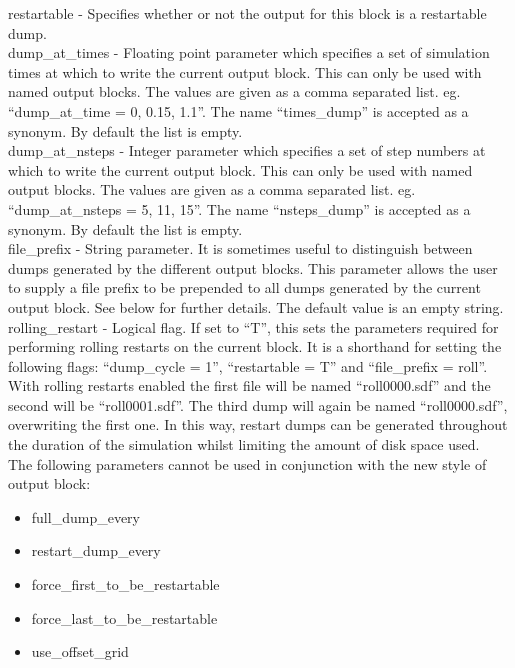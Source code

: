 {\emphtext restartable} - Specifies whether or not the output for this
  block is a restartable dump.\\

{\emphtext dump\_at\_times} - Floating point parameter which specifies a
  set of simulation times at which to write the current output block. This
  can only be used with named output blocks. The values are given as a
  comma separated list. eg. ``dump\_at\_time = 0, 0.15, 1.1''. The name
  ``times\_dump'' is accepted as a synonym. By default
  the list is empty.\\

{\emphtext dump\_at\_nsteps} - Integer parameter which specifies a
  set of step numbers at which to write the current output block. This
  can only be used with named output blocks. The values are given as a
  comma separated list. eg. ``dump\_at\_nsteps = 5, 11, 15''. The name
  ``nsteps\_dump'' is accepted as a synonym. By default
  the list is empty.\\

{\emphtext file\_prefix} - String parameter. It is sometimes useful to
  distinguish between dumps generated by the different output blocks. This
  parameter allows the user to supply a file prefix to be prepended to all
  dumps generated by the current output block. See below for further details.
  The default value is an empty string.\\

{\emphtext rolling\_restart} - Logical flag. If set to ``T'', this sets the
  parameters required for performing rolling restarts on the current block.
  It is a shorthand for setting the following flags: ``dump\_cycle = 1'',
  ``restartable = T'' and ``file\_prefix = roll''.
  With rolling restarts enabled the first file will be named ``roll0000.sdf''
  and the second will be ``roll0001.sdf''. The third dump will again be
  named ``roll0000.sdf'', overwriting the first one. In this way, restart
  dumps can be generated throughout the duration of the simulation whilst
  limiting the amount of disk space used.\\

The following parameters cannot be used in conjunction with the new style
of output block:

\begin{itemize}
\item full\_dump\_every
\item restart\_dump\_every
\item force\_first\_to\_be\_restartable
\item force\_last\_to\_be\_restartable
\item use\_offset\_grid
\end{itemize}

